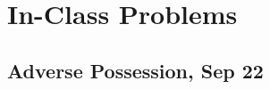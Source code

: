 \documentclass[11pt]{tex/lawoutline}
\begin{document}
\maketitle
\tableofcontents

\chapter{In-Class Problems}

\section{Adverse Possession, Sep 22}
\end{document}
